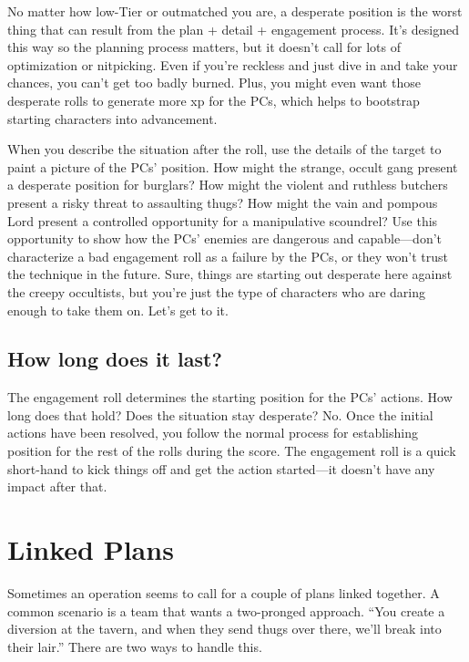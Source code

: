\documentclass[11pt,fleqn,a5paper]{book}
\begin{document}
No matter how low-Tier or outmatched you are, a desperate position is the worst thing that can result from the plan + detail + engagement process. It’s designed this way so the planning process matters, but it doesn’t call for lots of optimization or nitpicking. Even if you’re reckless and just dive in and take your chances, you can’t get too badly burned. Plus, you might even want those desperate rolls to generate more xp for the PCs, which helps to bootstrap starting characters into advancement.

When you describe the situation after the roll, use the details of the target to paint a picture of the PCs’ position. How might the strange, occult gang present a desperate position for burglars? How might the violent and ruthless butchers present a risky threat to assaulting thugs? How might the vain and pompous Lord present a controlled opportunity for a manipulative scoundrel? Use this opportunity to show how the PCs’ enemies are dangerous and capable---don’t characterize a bad engagement roll as a failure by the PCs, or they won’t trust the technique in the future. Sure, things are starting out desperate here against the creepy occultists, but you’re just the type of characters who are daring enough to take them on. Let’s get to it.

\subsection{How long does it last?}

The engagement roll determines the starting position for the PCs’ actions. How long does that hold? Does the situation stay desperate? No. Once the initial actions have been resolved, you follow the normal process for establishing position for the rest of the rolls during the score. The engagement roll is a quick short-hand to kick things off and get the action started---it doesn’t have any impact after that.

\section{Linked Plans}

Sometimes an operation seems to call for a couple of plans linked together. A common scenario is a team that wants a two-pronged approach. “You create a diversion at the tavern, and when they send thugs over there, we’ll break into their lair.” There are two ways to handle this.
\end{document}
